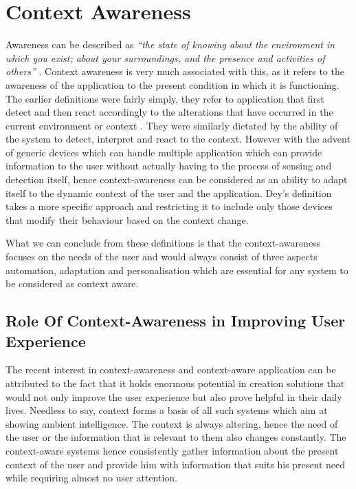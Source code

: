 \documentclass[12pt]{report}
\begin{document}
\section{Context Awareness}
Awareness can be described as \textit{``the state of knowing about the environment in which you exist; about your surroundings, and the presence and activities of others''} \cite{wisneski1998ambient}. Context awareness is very much associated with this, as it refers to the awareness of the application to the present condition in which it is functioning. The earlier definitions were fairly simply, they refer to application that first detect and then react accordingly to the alterations that have occurred in the current environment or context \cite{schilit1994disseminating}. They were similarly dictated by the ability of the system to detect, interpret and react to the context. However with the advent of generic devices which can handle multiple application which can provide information to the user without actually having to the process of sensing and detection itself, hence context-awareness can be considered as an ability to adapt itself to the dynamic context of the user and the application. Dey's \cite{abowd1999towards} definition takes a more specific approach and restricting it to include only those devices that modify their behaviour based on the context change.

What we can conclude from these definitions is that the context-awareness focuses on the needs of the user and would always consist of three aspects automation, adaptation and personalisation \cite{nelson1998context} which are essential for any system to be considered as context aware.

\subsection {Role Of Context-Awareness in Improving User Experience}

The recent interest in context-awareness and context-aware application can be attributed to the fact that it holds enormous potential in creation solutions that would not only improve the user experience but also prove helpful in their daily lives. Needless to say, context forms a basis of all such systems which aim at showing ambient intelligence. The context is always altering, hence the need of the user or the information that is relevant to them also changes constantly. The context-aware systems hence consistently gather information about the present context of the user and provide him with information that suits his present need while requiring almost no user attention.
\end{document}
